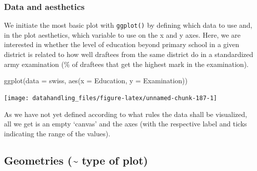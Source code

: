 \documentclass[
  12pt,
]{style/krantz}
\newenvironment{Shaded}{\begin{snugshade}}{\end{snugshade}}
\newcommand{\AttributeTok}[1]{\textcolor[rgb]{0.77,0.63,0.00}{#1}}
\newcommand{\CommentTok}[1]{\textcolor[rgb]{0.56,0.35,0.01}{\textit{#1}}}
\newcommand{\DecValTok}[1]{\textcolor[rgb]{0.00,0.00,0.81}{#1}}
\newcommand{\FunctionTok}[1]{\textcolor[rgb]{0.00,0.00,0.00}{#1}}
\newcommand{\NormalTok}[1]{#1}
\newcommand{\OtherTok}[1]{\textcolor[rgb]{0.56,0.35,0.01}{#1}}
\newcommand{\SpecialCharTok}[1]{\textcolor[rgb]{0.00,0.00,0.00}{#1}}
\newcommand{\StringTok}[1]{\textcolor[rgb]{0.31,0.60,0.02}{#1}}
\begin{document}
\begin{Shaded}
\end{Shaded}

\hypertarget{data-and-aesthetics}{%
\subsubsection{Data and aesthetics}\label{data-and-aesthetics}}

We initiate the most basic plot with \texttt{ggplot()} by defining which data to use and, in the plot aesthetics, which variable to use on the x and y axes. Here, we are interested in whether the level of education beyond primary school in a given district is related to how well draftees from the same district do in a standardized army examination (\% of draftees that get the highest mark in the examination).

\begin{Shaded}
\begin{Highlighting}[]
\FunctionTok{ggplot}\NormalTok{(}\AttributeTok{data =}\NormalTok{ swiss, }\FunctionTok{aes}\NormalTok{(}\AttributeTok{x =}\NormalTok{ Education, }\AttributeTok{y =}\NormalTok{ Examination))}
\end{Highlighting}
\end{Shaded}

\texttt{[image: datahandling\_files/figure-latex/unnamed-chunk-187-1]}

As we have not yet defined according to what rules the data shall be visualized, all we get is an empty `canvas' and the axes (with the respective label and ticks indicating the range of the values).

\hypertarget{geometries-type-of-plot}{%
\subsection{Geometries (\textasciitilde{} type of plot)}\label{geometries-type-of-plot}}
\end{document}
